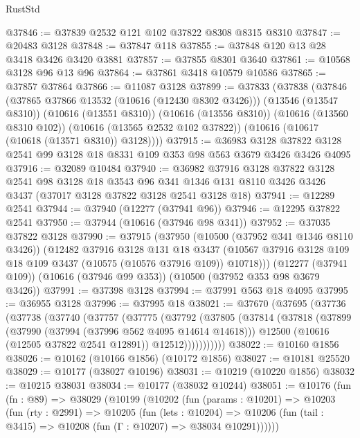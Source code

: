 \begin{lexlean}{RustStd}
\begin{coremodule}
@37846 := @37839 @2532 @121 @102 @37822 @8308 @8315 @8310
@37847 := @20483 @3128
@37848 := @37847 @118
@37855 := @37848 @120 @13 @28 @3418 @3426 @3420 @3881
@37857 := @37855 @8301 @3640
@37861 := @10568 @3128 @96 @13 @96
@37864 := @37861 @3418 @10579 @10586
@37865 := @37857 @37864
@37866 := @11087 @3128
@37899 := @37833
    (@37838
      (@37846
        (@37865 @37866 @13532 (@10616 (@12430 @8302 @3426)))
        (@13546 (@13547 @8310))
        (@10616 (@13551 @8310))
        (@10616 (@13556 @8310))
        (@10616 (@13560 @8310 @102))
        (@10616 (@13565 @2532 @102 @37822))
        (@10616 (@10617 (@10618 (@13571 @8310)) @3128))))
@37915 := @36983
    @3128
    @37822
    @3128
    @2541
    @99
    @3128
    @18
    @8331
    @109
    @353
    @98
    @563
    @3679
    @3426
    @3426
    @4095
@37916 := @32089 @10484
@37940 := @36982
    @37916
    @3128
    @37822
    @3128
    @2541
    @98
    @3128
    @18
    @3543
    @96
    @341
    @1346
    @131
    @8110
    @3426
    @3426
    @3437
    (@37017 @3128 @37822 @3128 @2541 @3128 @18)
@37941 := @12289 @2541
@37944 := @37940 (@12277 (@37941 @96))
@37946 := @12295 @37822 @2541
@37950 := @37944 (@10616 (@37946 @98 @341))
@37952 := @37035 @37822 @3128
@37990 := @37915
    (@37950
      (@10500 (@37952 @341 @1346 @8110 @3426))
      (@12482
        @37916
        @3128
        @131
        @18
        @3437
        (@10567 @37916 @3128 @109 @18 @109 @3437 (@10575 (@10576 @37916 @109)) @10718)))
    (@12277 (@37941 @109))
    (@10616 (@37946 @99 @353))
    (@10500 (@37952 @353 @98 @3679 @3426))
@37991 := @37398 @3128
@37994 := @37991 @563 @18 @4095
@37995 := @36955 @3128
@37996 := @37995 @18
@38021 := @37670
    (@37695
      (@37736
        (@37738
          (@37740
            (@37757
              (@37775
                (@37792
                  (@37805
                    (@37814
                      (@37818
                        (@37899
                          (@37990 (@37994 (@37996 @562 @4095 @14614 @14618)))
                          @12500
                          (@10616 (@12505 @37822 @2541 @12891))
                          @12512)))))))))))
@38022 := @10160 @1856
@38026 := @10162 (@10166 @1856) (@10172 @1856)
@38027 := @10181 @25520
@38029 := @10177 (@38027 @10196)
@38031 := @10219 (@10220 @1856)
@38032 := @10215 @38031
@38034 := @10177 (@38032 @10244)
@38051 := @10176
    (fun (fn : @89) =>
    @38029
      (@10199
        (@10202
          (fun (params : @10201) =>
          @10203
            (fun (rty : @2991) =>
            @10205
              (fun (lets : @10204) =>
              @10206 (fun (tail : @3415) => @10208 (fun (Γ : @10207) => @38034 @10291))))))

\end{coremodule}
\end{lexlean}
